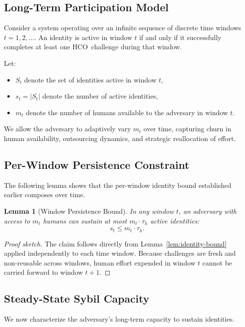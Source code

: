 \documentclass[11pt]{article}
\newcommand{\HCO}{HCO\xspace}
\newtheorem{lemma}{Lemma}
\begin{document}
\subsection{Long-Term Participation Model}

Consider a system operating over an infinite sequence of discrete time windows $t = 1,2,\dots$. An identity is active in window $t$ if and only if it successfully completes at least one \HCO\ challenge during that window.

Let:
\begin{itemize}
	\item $S_t$ denote the set of identities active in window $t$,
	\item $s_t = |S_t|$ denote the number of active identities,
	\item $m_t$ denote the number of humans available to the adversary in window $t$.
\end{itemize}

We allow the adversary to adaptively vary $m_t$ over time, capturing churn in human availability, outsourcing dynamics, and strategic reallocation of effort.

\subsection{Per-Window Persistence Constraint}

The following lemma shows that the per-window identity bound established earlier composes over time.

\begin{lemma}[Window Persistence Bound]
	\label{lem:persistence}
	In any window $t$, an adversary with access to $m_t$ humans can sustain at most $m_t \cdot \tau_h$ active identities:
	\[
	s_t \le m_t \cdot \tau_h .
	\]
\end{lemma}

\begin{proof}[Proof sketch]
	The claim follows directly from Lemma~\ref{lem:identity-bound} applied independently to each time window. Because challenges are fresh and non-reusable across windows, human effort expended in window $t$ cannot be carried forward to window $t+1$.
\end{proof}

\subsection{Steady-State Sybil Capacity}

We now characterize the adversary’s long-term capacity to sustain identities.
\end{document}
